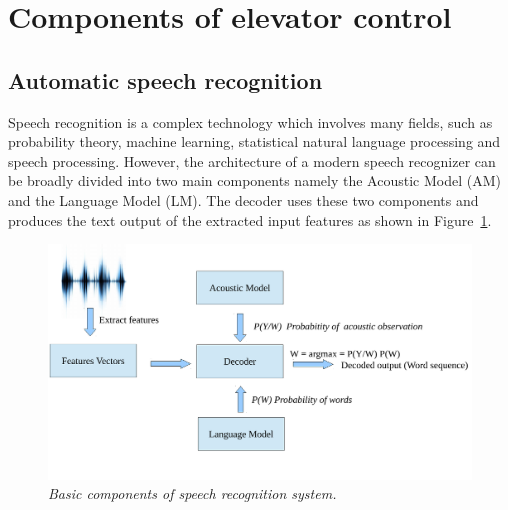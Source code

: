 \documentclass[a4paper, 12pt]{article}
\begin{document}


\pagestyle{empty}

\pagestyle{plain}
\setcounter{page}{1}
\tableofcontents
\cleardoublepage

\section{Components of elevator control}

\subsection{Automatic speech recognition}
Speech recognition is a complex technology which involves many fields, such as probability theory, machine learning, statistical natural language processing and speech processing. However, the architecture of a modern speech recognizer can be broadly divided into two main components namely the Acoustic Model (AM) and the Language Model (LM). The decoder uses these two components and produces the text output of the extracted input features as shown in Figure~\ref{fig:asr_component1}. 
\begin{figure}[ht]
\centering
\includegraphics[width=\textwidth]{ASR_Component1.pdf}
\vspace{-1.2cm}
\caption{\textit{Basic components of speech recognition system.}}
\label{fig:asr_component1}
\end{figure}
\end{document}
